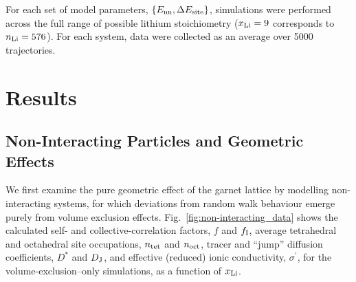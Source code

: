 \documentclass[aps,prb,twocolumn,superscriptaddress,reprint]{revtex4-1}
\newcommand{\set}[1]{\left\{#1\right\}}
\newcommand{\xLi}{x_\m{Li}}
\begin{document}
For each set of model parameters, $\set{E_\m{nn}, \Delta E_\m{site}}$, simulations were performed across the full range of possible lithium stoichiometry ($\xLi=9$ corresponds to $n_{\mathrm{Li}}=576$). 
For each system, data were collected as an average over 5000 trajectories. 


\section{Results}
\subsection{Non-Interacting Particles and Geometric Effects}
We first examine the pure geometric effect of the garnet lattice by modelling non-interacting systems, for which deviations from random walk behaviour emerge purely from volume exclusion effects. 
Fig.~\ref{fig:non-interacting_data} shows the calculated self- and collective-correlation factors, $f$ and $f_{\mathrm{I}}$, average tetrahedral and octahedral site occupations, $n_{\mathrm{tet}}$ and $n_{\mathrm{oct}}$, tracer and ``jump'' diffusion coefficients, $D^*$ and $D_{\mathrm{J}}$, and effective (reduced) ionic conductivity, $\sigma^\prime$, for the volume-exclusion--only simulations, as a function of $\xLi$.
\end{document}
